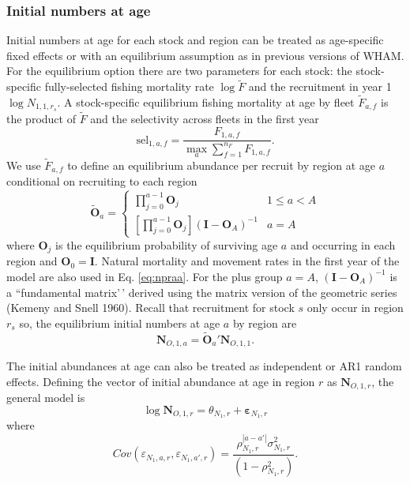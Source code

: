 \documentclass[
]{article}
\begin{document}
\hypertarget{initial-numbers-at-age}{%
\subsubsection*{Initial numbers at age}\label{initial-numbers-at-age}}

Initial numbers at age for each stock and region can be treated as
age-specific fixed effects or with an equilibrium assumption as in
previous versions of WHAM. For the equilibrium option there are two
parameters for each stock: the stock-specific fully-selected fishing
mortality rate \(\log \widetilde{F}\) and the recruitment in year 1
\(\log N_{1,1,r_s}\). A stock-specific equilibrium fishing mortality at
age by fleet \({\tilde F}_{a,f}\) is the product of \(\widetilde{F}\)
and the selectivity across fleets in the first year \begin{equation*}
  \text{sel}_{1,a,f} = \frac{F_{1,a,f}}{\max_a \sum_{f=1}^{n_F} F_{1,a,f}}.
\end{equation*} We use \(\widetilde{F}_{a,f}\) to define an equilibrium
abundance per recruit by region at age \(a\) conditional on recruiting
to each region \begin{equation}\label{eq:npraa}
 \widetilde{\mathbf{O}}_{a} = \left\{
 \begin{array}{ll}
\prod^{a-1}_{j=0}\mathbf{O}_{j}  & 1\leq a<A\\
\left[\prod^{a-1}_{j=0}\mathbf{O}_{j}\right] \left(\mathbf{I} - \mathbf{O}_{A}\right)^{-1} & a = A
 \end{array}
\right.
\end{equation} where \(\mathbf{O}_{j}\) is the equilibrium probability
of surviving age \(a\) and occurring in each region and
\(\mathbf{O}_{0} = \mathbf{I}\). Natural mortality and movement rates in
the first year of the model are also used in Eq. \ref{eq:npraa}. For the
plus group \(a=A\), \(\left(\mathbf{I} - \mathbf{O}_{A}\right)^{-1}\) is
a ``fundamental matrix'\,' derived using the matrix version of the
geometric series (Kemeny and Snell 1960). Recall that recruitment for
stock \(s\) only occur in region \(r_s\) so, the equilibrium initial
numbers at age \(a\) by region are
\[\mathbf{N}_{O,1,a} = \widetilde{\mathbf{O}}_{a}' \mathbf{N}_{O,1,1}.\]

The initial abundances at age can also be treated as independent or AR1
random effects. Defining the vector of initial abundance at age in
region \(r\) as \(\mathbf{N}_{O,1,r}\), the general model is
\[\log \mathbf{N}_{O,1,r} = \theta_{N_1,r} + \boldsymbol{\varepsilon}_{N_1,r}\]
where
\[  Cov\left(\varepsilon_{N_1,a,r},\varepsilon_{N_1,a',r}\right) = \frac{\rho_{N_1,r}^{|a-a'|}\sigma^2_{N_1,r}} {\left(1-\rho_{N_1,r}^2\right)}.\]
\end{document}
